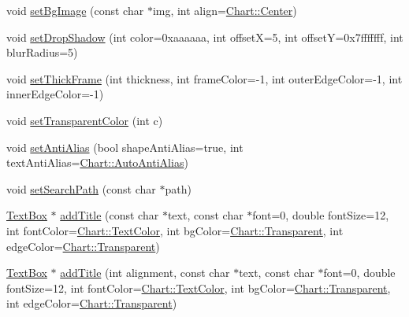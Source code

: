 \begin{DoxyCompactItemize}
\item 
void \hyperlink{class_base_chart_a0e8bd2475ae0d998d5936ebeb307c5e1}{set\+Bg\+Image} (const char $\ast$img, int align=\hyperlink{namespace_chart_ae222e51ce11a254450b6ddfbc862680aab21c196681da027efd151236305b985d}{Chart\+::\+Center})
\item 
void \hyperlink{class_base_chart_a4b124130d9ced71df335c970a716dde9}{set\+Drop\+Shadow} (int color=0xaaaaaa, int offset\+X=5, int offset\+Y=0x7fffffff, int blur\+Radius=5)
\item 
void \hyperlink{class_base_chart_a204e0280f39dae0edc41b9b89b412131}{set\+Thick\+Frame} (int thickness, int frame\+Color=-\/1, int outer\+Edge\+Color=-\/1, int inner\+Edge\+Color=-\/1)
\item 
void \hyperlink{class_base_chart_aa24c1dca691c24ad711a0dd669b505c0}{set\+Transparent\+Color} (int c)
\item 
void \hyperlink{class_base_chart_a04c6e9606f39ad2dfbabb7d3d6b147e6}{set\+Anti\+Alias} (bool shape\+Anti\+Alias=true, int text\+Anti\+Alias=\hyperlink{namespace_chart_a07883b6d552537a99c7dab3bdc641d2ba793ff02fc6d46a7d5ebcbac29e111a3f}{Chart\+::\+Auto\+Anti\+Alias})
\item 
void \hyperlink{class_base_chart_a516a494b8b4e42478f2df639a834e387}{set\+Search\+Path} (const char $\ast$path)
\item 
\hyperlink{class_text_box}{Text\+Box} $\ast$ \hyperlink{class_base_chart_a06e200a95fd2a9c00522b896a6ff5dc5}{add\+Title} (const char $\ast$text, const char $\ast$font=0, double font\+Size=12, int font\+Color=\hyperlink{namespace_chart_abee0d882fdc9ad0b001245ad9fc64011a879e14f2f5024caccc047374342321ef}{Chart\+::\+Text\+Color}, int bg\+Color=\hyperlink{namespace_chart_abee0d882fdc9ad0b001245ad9fc64011afc6811800a9e2582dac0157b6279f836}{Chart\+::\+Transparent}, int edge\+Color=\hyperlink{namespace_chart_abee0d882fdc9ad0b001245ad9fc64011afc6811800a9e2582dac0157b6279f836}{Chart\+::\+Transparent})
\item 
\hyperlink{class_text_box}{Text\+Box} $\ast$ \hyperlink{class_base_chart_accd91106cbf8ca45cd8725b0ed2bb833}{add\+Title} (int alignment, const char $\ast$text, const char $\ast$font=0, double font\+Size=12, int font\+Color=\hyperlink{namespace_chart_abee0d882fdc9ad0b001245ad9fc64011a879e14f2f5024caccc047374342321ef}{Chart\+::\+Text\+Color}, int bg\+Color=\hyperlink{namespace_chart_abee0d882fdc9ad0b001245ad9fc64011afc6811800a9e2582dac0157b6279f836}{Chart\+::\+Transparent}, int edge\+Color=\hyperlink{namespace_chart_abee0d882fdc9ad0b001245ad9fc64011afc6811800a9e2582dac0157b6279f836}{Chart\+::\+Transparent})

\end{DoxyCompactItemize}
